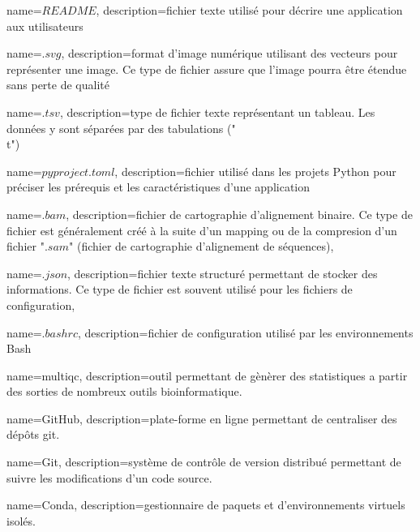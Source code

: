  {
    name=$README$,
    description={fichier texte utilisé pour décrire une application aux utilisateurs}
}
\newcommand{\readme}{\gls{readme}}


 {
   name=$.svg$,
    description={format d'image numérique utilisant des vecteurs pour représenter une image. Ce type de fichier assure que l'image pourra être étendue sans perte de qualité }
}
\newcommand{\svg}{"\gls{svg}"}

 {
   name=$.tsv$,
    description={type de fichier texte représentant un tableau. Les données y sont séparées par des tabulations ("\\t")}
}
\newcommand{\tsv}{"\gls{tsv}"}

 {
   name=$pyproject.toml$,
    description={fichier utilisé dans les projets \gls{Python} pour préciser les prérequis et les caractéristiques d'une application}
}

 {
    name=$.bam$,
    description={fichier de cartographie d'alignement binaire. Ce type de fichier est généralement créé à la suite d'un \gls{mapping} ou de la compresion d'un fichier "$.sam$" (fichier de cartographie d'alignement de séquences)},
}
\newcommand{\bam}{"\gls{bam}"}

 {
    name=$.json$,
    description={fichier texte structuré permettant de stocker des informations. Ce type de fichier est souvent utilisé pour les fichiers de configuration},
}
\newcommand{\json}{"\gls{json}"}

 {
    name=$.bashrc$,
    description={fichier de configuration utilisé par les environnements \gls{Bash}}
}

 {
    name=multiqc,
    description={outil permettant de gènèrer des statistiques a partir des sorties de nombreux outils bioinformatique. \cite{multiqc}}
}
\newcommand{\fastqc}{\gls{fastqc}}

 {
    name=GitHub,
    description={plate-forme en ligne permettant de centraliser des dépôts \gls{git}. \cite{github}}
}
\newcommand{\GitHub}{\gls{GitHub}}

 {
    name=Git,
    description={système de contrôle de version distribué permettant de suivre les modifications d'un code source. \cite{git}}
}

 {
    name=Conda,
    description={gestionnaire de paquets et d'environnements virtuels isolés. \cite{conda}}
}
\newcommand{\Conda}{\gls{Conda}}


